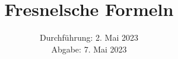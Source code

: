 

\subject{\texorpdfstring{\vspace{2ex}}{}V407\texorpdfstring{\vspace{-2ex}}{}} %
\title{Fresnelsche Formeln} %
\date{
	Durchführung: 2. Mai 2023 %
	\\ Abgabe: 7. Mai 2023 %
}




\maketitle
\thispagestyle{empty}


\tableofcontents
\newpage







\printbibliography{}

\newpage



